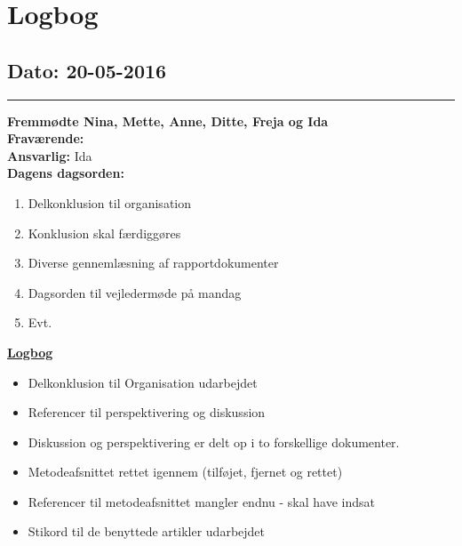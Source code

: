 \chapter{Logbog}
\section{Dato: 20-05-2016}
\hrule
\textbf{Fremmødte Nina, Mette, Anne, Ditte, Freja og Ida } \\
\textbf{Fraværende: } \\
\textbf{Ansvarlig:} Ida  \\
\textbf{Dagens dagsorden: }
\begin{enumerate}
\item Delkonklusion til organisation
\item Konklusion skal færdiggøres
\item Diverse gennemlæsning af rapportdokumenter
\item Dagsorden til vejledermøde på mandag
\item Evt.
\end{enumerate}

\underline{\textbf{Logbog}}
\begin{itemize}
\item Delkonklusion til Organisation udarbejdet
\item Referencer til perspektivering og diskussion
\item Diskussion og perspektivering er delt op i to forskellige dokumenter.
\item Metodeafsnittet rettet igennem (tilføjet, fjernet og rettet)
\item Referencer til metodeafsnittet mangler endnu - skal have indsat
\item Stikord til de benyttede artikler udarbejdet
\end{itemize}
\newpage